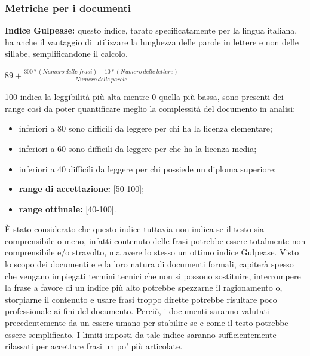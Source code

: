 		\subsubsection{Metriche per i documenti}
		\textbf{Indice Gulpease:} questo indice, tarato specificatamente per la lingua italiana, ha anche il vantaggio di utilizzare la lunghezza delle parole in lettere e non delle sillabe, semplificandone il calcolo.
			\begin{center}
				\begin{math}
					89+\frac{300 * (Numero\ delle\ frasi) - 10 * (Numero\ delle\ lettere)}{Numero\ delle\ parole}
				\end{math}
			\end{center}
		100 indica la leggibilità più alta mentre 0 quella più bassa, sono presenti dei range così da poter quantificare meglio la complessità del documento in analisi:
			\begin{itemize}
				\item inferiori a 80 sono difficili da leggere per chi ha la licenza elementare;
				\item inferiori a 60 sono difficili da leggere per che ha la licenza media;
				\item inferiori a 40 difficili da leggere per chi possiede un diploma superiore;
			\end{itemize}
			\begin{itemize}
					\item \textbf{range di accettazione:} [50-100];
					\item \textbf{range ottimale:} [40-100].
			\end{itemize}

È stato considerato che questo indice tuttavia non indica se il testo sia comprensibile o meno, infatti contenuto delle frasi potrebbe essere totalmente non comprensibile e/o stravolto, ma
avere lo stesso un ottimo indice Gulpease. Visto lo scopo dei documenti e e la loro natura di documenti formali, capiterà spesso che vengano impiegati termini tecnici che non si possono sostituire, interrompere la frase a favore di un indice più alto potrebbe spezzarne il ragionamento o, storpiarne il contenuto e usare frasi troppo dirette potrebbe risultare poco professionale ai fini del documento. Perciò, i documenti saranno valutati precedentemente da un essere umano per stabilire se e come il testo potrebbe essere semplificato. I limiti imposti da tale indice saranno sufficientemente rilassati per accettare frasi un po' più articolate.
